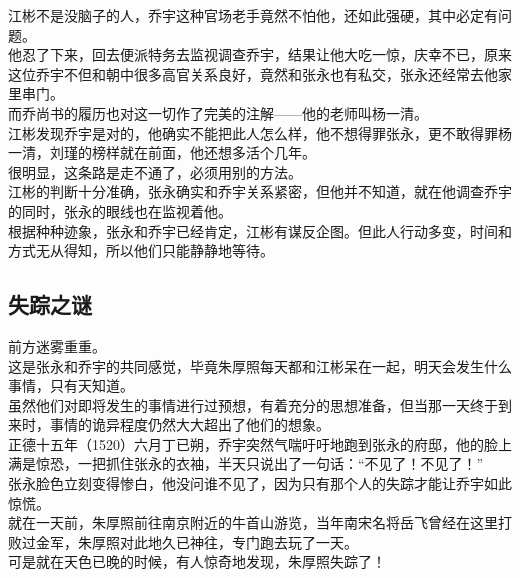 \begin{multicols}{\theparacolNo}
江彬不是没脑子的人，乔宇这种官场老手竟然不怕他，还如此强硬，其中必定有问题。\\

他忍了下来，回去便派特务去监视调查乔宇，结果让他大吃一惊，庆幸不已，原来这位乔宇不但和朝中很多高官关系良好，竟然和张永也有私交，张永还经常去他家里串门。\\

而乔尚书的履历也对这一切作了完美的注解——他的老师叫杨一清。\\

江彬发现乔宇是对的，他确实不能把此人怎么样，他不想得罪张永，更不敢得罪杨一清，刘瑾的榜样就在前面，他还想多活个几年。\\

很明显，这条路是走不通了，必须用别的方法。\\

江彬的判断十分准确，张永确实和乔宇关系紧密，但他并不知道，就在他调查乔宇的同时，张永的眼线也在监视着他。\\

根据种种迹象，张永和乔宇已经肯定，江彬有谋反企图。但此人行动多变，时间和方式无从得知，所以他们只能静静地等待。\\

\subsection{失踪之谜}
前方迷雾重重。\\

这是张永和乔宇的共同感觉，毕竟朱厚照每天都和江彬呆在一起，明天会发生什么事情，只有天知道。\\

虽然他们对即将发生的事情进行过预想，有着充分的思想准备，但当那一天终于到来时，事情的诡异程度仍然大大超出了他们的想象。\\

正德十五年（1520）六月丁已朔，乔宇突然气喘吁吁地跑到张永的府邸，他的脸上满是惊恐，一把抓住张永的衣袖，半天只说出了一句话：“不见了！不见了！”\\

张永脸色立刻变得惨白，他没问谁不见了，因为只有那个人的失踪才能让乔宇如此惊慌。\\

就在一天前，朱厚照前往南京附近的牛首山游览，当年南宋名将岳飞曾经在这里打败过金军，朱厚照对此地久已神往，专门跑去玩了一天。\\

可是就在天色已晚的时候，有人惊奇地发现，朱厚照失踪了！\\


\end{multicols}
